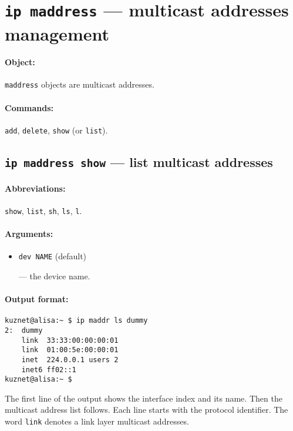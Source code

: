\section{{\tt ip maddress} --- multicast addresses management}
\label{IP-MADDR}

\paragraph{Object:} \verb|maddress| objects are multicast addresses.

\paragraph{Commands:} \verb|add|, \verb|delete|, \verb|show| (or \verb|list|).

\subsection{{\tt ip maddress show} --- list multicast addresses}

\paragraph{Abbreviations:} \verb|show|, \verb|list|, \verb|sh|, \verb|ls|, \verb|l|.

\paragraph{Arguments:}

\begin{itemize}

\item \verb|dev NAME| (default)

--- the device name.

\end{itemize}

\paragraph{Output format:}

\begin{verbatim}
kuznet@alisa:~ $ ip maddr ls dummy
2:  dummy
    link  33:33:00:00:00:01
    link  01:00:5e:00:00:01
    inet  224.0.0.1 users 2
    inet6 ff02::1
kuznet@alisa:~ $ 
\end{verbatim}

The first line of the output shows the interface index and its name.
Then the multicast address list follows. Each line starts with the
protocol identifier. The word \verb|link| denotes a link layer
multicast addresses.

